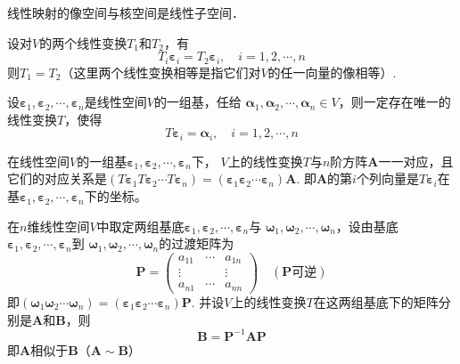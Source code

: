     \begin{theorem}
        线性映射的像空间与核空间是线性子空间．
    \end{theorem}

    \begin{theorem}
        设对$V$的两个线性变换$T_1$和$T_2$，有
        $$T_i\boldsymbol{\varepsilon }_i=T_2\boldsymbol{\varepsilon }_i,\quad i=1,2,\cdots,n$$
        则$T_1=T_2$（这里两个线性变换相等是指它们对$V$的任一向量的像相等）.
    \end{theorem}

    \begin{theorem}
        设$\boldsymbol{\varepsilon}_1,\boldsymbol{\varepsilon}_2,\cdots,\boldsymbol{\varepsilon}_n$是线性空间$V$的一组基，任给
        $\boldsymbol{\alpha}_1,\boldsymbol{\alpha}_2,\cdots,\boldsymbol{\alpha}_n\in V$，则一定存在唯一的线性变换$T$，使得
        $$T\boldsymbol{\varepsilon}_i=\boldsymbol{\alpha}_i,\quad i=1,2,\cdots,n$$
    \end{theorem}

    \begin{theorem}
        在线性空间$V$的一组基$\boldsymbol{\varepsilon}_1,\boldsymbol{\varepsilon}_2,\cdots,\boldsymbol{\varepsilon}_n$下，
        $V$上的线性变换$T$与$n$阶方阵$\boldsymbol{A}$一一对应，且它们的对应关系是$(T\boldsymbol{\varepsilon}_1T\boldsymbol{\varepsilon}_2\cdots T\boldsymbol{\varepsilon}_n)=(\boldsymbol{\varepsilon}_1\boldsymbol{\varepsilon}_2\cdots\boldsymbol{\varepsilon}_n)\boldsymbol{A}$.
        即$\boldsymbol{A}$的第$i$个列向量是$T\boldsymbol{\varepsilon}_i$在基$\boldsymbol{\varepsilon}_1,\boldsymbol{\varepsilon}_2,\cdots,\boldsymbol{\varepsilon}_n$下的坐标。
    \end{theorem}

    \begin{theorem}
        在$n$维线性空间$V$中取定两组基底$\boldsymbol{\varepsilon}_1,\boldsymbol{\varepsilon}_2,\cdots,\boldsymbol{\varepsilon}_n$与
        $\boldsymbol{\omega}_1,\boldsymbol{\omega}_2,\cdots,\boldsymbol{\omega}_n$，设由基底$\boldsymbol{\varepsilon}_1,\boldsymbol{\varepsilon}_2,\cdots,\boldsymbol{\varepsilon}_n$到
        $\boldsymbol{\omega}_1,\boldsymbol{\omega}_2,\cdots,\boldsymbol{\omega}_n$的过渡矩阵为
        $$\boldsymbol{P}=\left(\begin{array}{ccc}
            a_{11} & \cdots &a_{1n} \\
            \vdots & & \vdots\\
            a_{n1} & \cdots &a_{nn} 
        \end{array}\right)\quad(\boldsymbol{P}\mbox{可逆})$$
        即$(\boldsymbol{\omega}_1\boldsymbol{\omega}_2\cdots\boldsymbol{\omega}_n)=(\boldsymbol{\varepsilon}_1\boldsymbol{\varepsilon}_2\cdots\boldsymbol{\varepsilon}_n)\boldsymbol{P}$.
        并设$V$上的线性变换$T$在这两组基底下的矩阵分别是$\boldsymbol{A}$和$\boldsymbol{B}$，则
        $$\boldsymbol{B}=\boldsymbol{P}^{-1}\boldsymbol{A}\boldsymbol{P}$$
        即$\boldsymbol{A}$相似于$\boldsymbol{B}$（$\boldsymbol{A}\sim \boldsymbol{B}$）
    \end{theorem}

